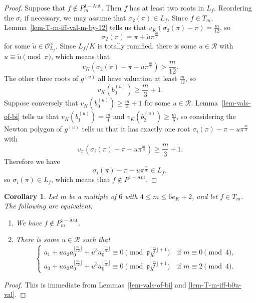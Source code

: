 \documentclass[11pt]{amsart}
\theoremstyle{theorem}
\newtheorem{corollary}[theorem]{Corollary}
\theoremstyle{example}
\theoremstyle{definition}
\numberwithin{theorem}{section}
\numberwithin{theorem}{section}
\newcommand{\co}{\mathcal{O}}
\newcommand{\p}{\mathfrak{p}}
\newcommand{\oneaut}{\mathrm{1-Aut}}
\begin{document}
\begin{proof}
    Suppose that $f \not \in P_m^{\oneaut}$. Then $f$ has at least two roots in $L_f$. Reordering the $\sigma_i$ if necessary, we may assume that $\sigma_2(\pi) \in L_f$. Since $f \in T_m$, Lemma~\ref{lem-T-m-iff-val-m-by-12} tells us that $v_K(\sigma_2(\pi) - \pi) = \frac{m}{12}$, so 
    $$
    \sigma_2(\pi) = \pi + \tilde{u}\pi^{\frac{m}{3}}
    $$
    for some $\tilde{u} \in \co_{L_f}^\times$. Since $L_f/K$ is totally ramified, there is some $u\in \mathcal{R}$ with $u \equiv \tilde{u}\pmod{\pi}$, which means that 
    $$
    v_K(\sigma_2(\pi) - \pi - u\pi^{\frac{m}{3}}) > \frac{m}{12}.
    $$ 
    The other three roots of $g^{(u)}$ all have valuation at least $\frac{m}{12}$, so 
    $$
    v_K(b_0^{(u)}) \geq \frac{m}{3} + 1.
    $$
    Suppose conversely that $v_K(b_0^{(u)}) \geq \frac{m}{3} + 1$ for some $u \in \mathcal{R}$. Lemma~\ref{lem-vals-of-bi} tells us that $v_K(b_1^{(u)}) = \frac{m}{4}$ and $v_K(b_2^{(u)}) \geq \frac{m}{6}$, so considering the Newton polygon of $g^{(u)}$ tells us that it has exactly one root $\sigma_i(\pi) - \pi - u\pi^{\frac{m}{3}}$ with 
    $$
    v_\pi(\sigma_i(\pi) - \pi - u\pi^{\frac{m}{3}}) \geq \frac{m}{3} + 1.
    $$
    Therefore we have 
    $$
    \sigma_i(\pi) - \pi - u\pi^{\frac{m}{3}} \in L_f,
    $$
    so $\sigma_i(\pi) \in L_f$, which means that $f \not \in P^{\oneaut}$.
\end{proof}



\begin{corollary}
    \label{cor-cong-cond-m-multiple-of-6}
    Let $m$ be a multiple of $6$ with $4 \leq m \leq 6e_K + 2$, and let $f \in T_m$. The following are equivalent:
    \begin{enumerate}
        \item We have $f \not \in P_m^{\oneaut}$.
        \item There is some $u \in \mathcal{R}$ such that 
        $$
        \begin{cases}
            a_1 + ua_2a_0^{\lfloor\frac{m}{12}\rfloor} + u^3a_0^{\lfloor \frac{m}{4}\rfloor} \equiv 0 \pmod{\p_K^{\lfloor \frac{m}{4}\rfloor + 1}}\quad\text{if $m\equiv 0 \pmod{4}$},
            \\
            a_3 + ua_2a_0^{\lfloor\frac{m}{12}\rfloor} + u^3a_0^{\lfloor \frac{m}{4}\rfloor} \equiv 0 \pmod{\p_K^{\lfloor \frac{m}{4}\rfloor + 1}}\quad \text{if $m\equiv 2\pmod{4}$}.
        \end{cases}
        $$
    \end{enumerate}
\end{corollary}
\begin{proof}
    This is immediate from Lemmas~\ref{lem-vals-of-bi} and \ref{lem-T-m-iff-b0u-val}.
\end{proof}
\end{document}
